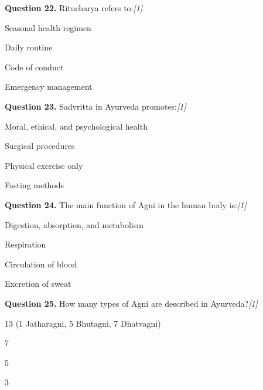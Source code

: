 \documentclass[11pt,a4paper]{article}
\newcommand{\pts}[1]{\hfill   \textit{[#1]}}
\begin{document}
\medskip




\noindent   \textbf{Question 22.} Ritucharya refers to:\pts{1}

\begin{parts}
  \item Seasonal health regimen
  \item Daily routine
  \item Code of conduct
  \item Emergency management
\end{parts}

\medskip




\noindent   \textbf{Question 23.} Sadvritta in Ayurveda promotes:\pts{1}

\begin{parts}
  \item Moral, ethical, and psychological health
  \item Surgical procedures
  \item Physical exercise only
  \item Fasting methods
\end{parts}

\medskip




\noindent   \textbf{Question 24.} The main function of Agni in the human body is:\pts{1}

\begin{parts}
  \item Digestion, absorption, and metabolism
  \item Respiration
  \item Circulation of blood
  \item Excretion of sweat
\end{parts}

\medskip




\noindent   \textbf{Question 25.} How many types of Agni are described in Ayurveda?\pts{1}

\begin{parts}
  \item 13 (1 Jatharagni, 5 Bhutagni, 7 Dhatvagni)
  \item 7
  \item 5
  \item 3
\end{parts}

\medskip
\end{document}
